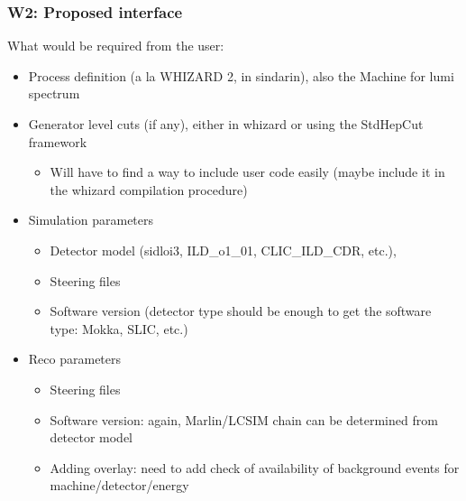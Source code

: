 \documentclass[10pt,table,dvipsnames]{beamer}
\begin{document}
\begin{frame}
  \frametitle{W2: Proposed interface}
What would be required from the user:
\begin{itemize}
\item Process definition (a la WHIZARD 2, in sindarin), also the
  Machine for lumi spectrum
\item Generator level cuts (if any), either in whizard or using the
  StdHepCut framework
  \begin{itemize}
  \item Will have to find a way to include user code easily (maybe
    include it in the whizard compilation procedure)
  \end{itemize}
\item Simulation parameters
  \begin{itemize}
  \item Detector model (sidloi3, ILD\_o1\_01,
  CLIC\_ILD\_CDR, etc.), 
  \item Steering files 
  \item Software version (detector type should be enough to get the
    software type: Mokka, SLIC, etc.)
  \end{itemize}
\item Reco parameters
  \begin{itemize}
  \item Steering files
  \item Software version: again, Marlin/LCSIM chain can be determined
    from detector model
  \item Adding overlay: need to add check of availability of
    background events for machine/detector/energy
  \end{itemize}
\end{itemize}
\end{frame}
\end{document}
